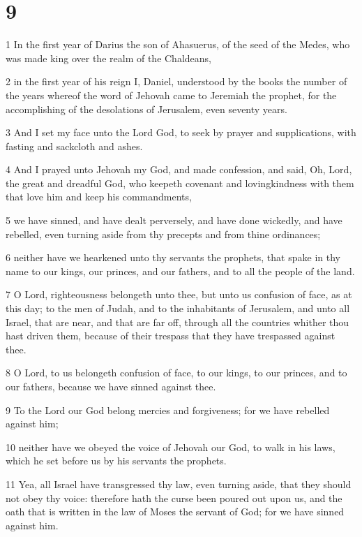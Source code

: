 \chapter{9}

\par 1 In the first year of Darius the son of Ahasuerus, of the seed of the Medes, who was made king over the realm of the Chaldeans,
\par 2 in the first year of his reign I, Daniel, understood by the books the number of the years whereof the word of Jehovah came to Jeremiah the prophet, for the accomplishing of the desolations of Jerusalem, even seventy years.
\par 3 And I set my face unto the Lord God, to seek by prayer and supplications, with fasting and sackcloth and ashes.
\par 4 And I prayed unto Jehovah my God, and made confession, and said, Oh, Lord, the great and dreadful God, who keepeth covenant and lovingkindness with them that love him and keep his commandments,
\par 5 we have sinned, and have dealt perversely, and have done wickedly, and have rebelled, even turning aside from thy precepts and from thine ordinances;
\par 6 neither have we hearkened unto thy servants the prophets, that spake in thy name to our kings, our princes, and our fathers, and to all the people of the land.
\par 7 O Lord, righteousness belongeth unto thee, but unto us confusion of face, as at this day; to the men of Judah, and to the inhabitants of Jerusalem, and unto all Israel, that are near, and that are far off, through all the countries whither thou hast driven them, because of their trespass that they have trespassed against thee.
\par 8 O Lord, to us belongeth confusion of face, to our kings, to our princes, and to our fathers, because we have sinned against thee.
\par 9 To the Lord our God belong mercies and forgiveness; for we have rebelled against him;
\par 10 neither have we obeyed the voice of Jehovah our God, to walk in his laws, which he set before us by his servants the prophets.
\par 11 Yea, all Israel have transgressed thy law, even turning aside, that they should not obey thy voice: therefore hath the curse been poured out upon us, and the oath that is written in the law of Moses the servant of God; for we have sinned against him.
